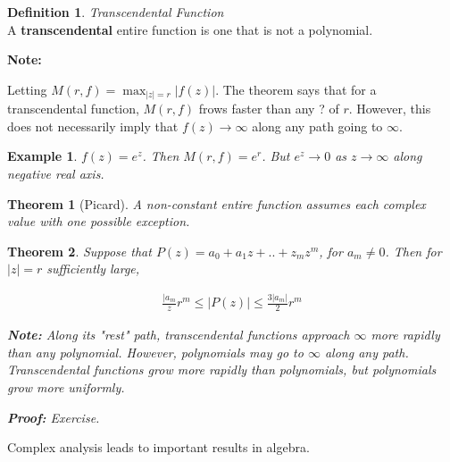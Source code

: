 \documentclass{article}
\newtheorem{theorem}{Theorem}[section]
\newtheorem{ex}{Example}
\theoremstyle{definition}
\newtheorem{definition}{Definition}[section]
\newcommand{\Def}[2]{
\begin{shaded*}
\begin{definition}{\textit{#1}}\\#2\end{definition}
\end{shaded*}
}
\begin{document}
\Def{Transcendental Function}{A \textbf{transcendental} entire function is one that is not a polynomial. }

\textbf{Note:}

Letting $M(r,f) = \max_{|z|=r} |f(z)|$. The theorem says that for a transcendental function, $M(r,f)$ frows faster than any ? of $r$. However, this does not necessarily imply that $f(z) \to \infty$ along any path going to $\infty$. 

\begin{ex}
$f(z) = e^z$. Then $M(r,f) = e^r$. But $e^z \to 0$ as $z \to \infty$ along negative real axis. 
\end{ex}

\begin{theorem}[Picard]
A non-constant entire function assumes each complex value with one possible exception.
\end{theorem}

\begin{theorem}
Suppose that $P(z) = a_0 + a_1 z + .. + z_m z^m$, for $a_m \neq 0$. Then for $|z| = r$ sufficiently large, 

\begin{align}
\frac{|a_m}{z} r^m \leq |P(z)| \leq \frac{3 |a_m|}{2} r^m
\end{align}

\textbf{Note:}
Along its "rest" path, transcendental functions approach $\infty$ more rapidly than any polynomial. However, polynomials may go to $\infty$ along any path. Transcendental functions grow more rapidly than polynomials, but polynomials grow more uniformly. 

\textbf{Proof:} Exercise.
\end{theorem}

Complex analysis leads to important results in algebra. 
\end{document}
